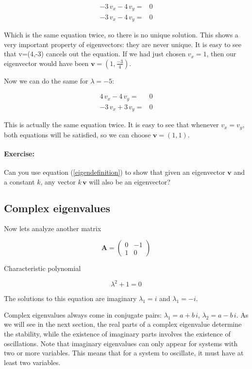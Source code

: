 \documentclass{tufte-book} %
\begin{document}
\begin{align*}
	-3 \, v_x - 4 \, v_y =& 0 \nonumber\\
	-3 \, v_x - 4 \, v_y =& 0 \nonumber
\end{align*}

Which is the same equation twice, so there is no unique solution. This shows a very important property of eigenvectors: they are never unique. It is easy to see that v=(4,-3) cancels out the equation. If we had just chosen $v_x=1$, then our eigenvector would have been $\mathbf{v}=\left( 1,\frac{-3}{4} \right)$.

Now we can do the same for  $\lambda = -5$:

\begin{align*}
	4 \, v_x - 4 \, v_y =& 0 \nonumber\\
	- 3 \, v_x  + 3 \, v_y =& 0 \nonumber
\end{align*}

This is actually the same equation twice. It is easy to see that whenever $v_x=v_y$, both equations will be satisfied, so we can choose $\mathbf{v} = (1, 1)$.

\paragraph{Exercise:} Can you use equation (\ref{eigendefinition}) to show that given an eigenvector $\mathbf{v}$ and a constant $k$, any vector $k \, \mathbf{v}$ will also be an eigenvector?

\subsection{Complex eigenvalues}

Now lets analyze another matrix 

\begin{equation}
	\mathbf{A}  = \begin{pmatrix} 0 & -1\\ 1 & 0\end{pmatrix}  \nonumber
\end{equation}

Characteristic polynomial

\begin{equation}
	\lambda^2 + 1 = 0 \nonumber
\end{equation}

The solutions to this equation are imaginary $\lambda_1 = i$ and $\lambda_1 = -i$.

Complex eigenvalues always come in conjugate pairs: $\lambda_1 = a + b\, i$,  $\lambda_2 = a - b\, i$. As we will see in the next section, the real parts of a complex eigenvalue determine the stability, while the existence of imaginary parts involves the existence of oscillations. Note that imaginary eigenvalues can only appear for systems with two or more variables. This means that for a system to oscillate, it must have at least two variables.
\end{document}
